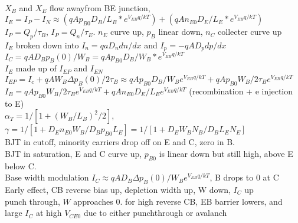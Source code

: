\documentclass{article}
\begin{document}
\\$X_B$ and $X_E$ flow awayfrom BE junction, $I_E=I_P-I_N\approx (qAp_{B0}D_B/L_B*e^{V_{EB} q/kT})+(qAn_{E0}D_E/L_E*e^{V_{EB} q/kT})$
\\$I_P=Q_p/\tau_B$, $I_P=Q_n/\tau_E$. $n_E$ curve up, $p_B$ linear down, $n_C$ collecter curve up
\\$I_E$ broken down into $I_n=qaD_n dn/dx$ and $I_p=-qAD_p dp/dx$
\\$I_C=qAD_B p_B(0)/W_B=qAp_{B0}D_B/W_B*e^{V_{EB} q/kT}$
\\$I_E$ made up of $I_{EP}$ and $I_{EN}$
\\$I_{EP}=I_c+qAW_B\Delta p_B(0)/2\tau_B\approx qAp_{B0}D_B/W_B e^{V_{EB} q/kT}+qAp_{B0}W_B/2\tau_B e^{V_{EB} q/kT}$
\\$I_B=qAp_{B0}W_B/2\tau_B e^{V_{EB} q/kT}+qAn_{E0}D_E/L_Ee^{V_{EB}q/kT}$ (recombination + e injection to E)
\\$\alpha_T=1/[1+(W_B/L_B)^2/2]$, $\gamma=1/[1+D_En_{E0}W_B/D_Bp_{B0}L_E]=1/[1+D_EW_BN_B/D_BL_EN_E]$
\\BJT in cutoff, minority carriers drop off on E and C, zero in B.  
\\BJT in saturation, E and C curve up, $p_{B0}$ is linear down but still high, above E below C.
\\Base width modulation $I_C\approx qAD_B \Delta p_B(0)/W_B e^{V_{EB}q/kT}$, B drops to 0 at C
\\Early effect, CB reverse bias up, depletion width up, W down, $I_C$ up
\\punch through, $W$ approaches $0$. for high reverse CB, EB barrier lowers, and large $I_C$ at high $V_{CE0}$ due to either punchthrough or avalanch


\end{document}
